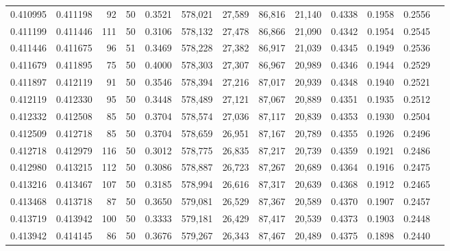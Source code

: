 \begin{tabular}{rrrrrrrrrrrrr}
0.410995 & 0.411198 &    92 &  50 &                                     0.3521 & 578,021 &  27,589 &  86,816 &  21,140 & 0.4338 & 0.1958 & 0.2556 \\
0.411199 & 0.411446 &   111 &  50 &                                     0.3106 & 578,132 &  27,478 &  86,866 &  21,090 & 0.4342 & 0.1954 & 0.2545 \\
0.411446 & 0.411675 &    96 &  51 &                                     0.3469 & 578,228 &  27,382 &  86,917 &  21,039 & 0.4345 & 0.1949 & 0.2536 \\
0.411679 & 0.411895 &    75 &  50 &                                     0.4000 & 578,303 &  27,307 &  86,967 &  20,989 & 0.4346 & 0.1944 & 0.2529 \\
0.411897 & 0.412119 &    91 &  50 &                                     0.3546 & 578,394 &  27,216 &  87,017 &  20,939 & 0.4348 & 0.1940 & 0.2521 \\
0.412119 & 0.412330 &    95 &  50 &                                     0.3448 & 578,489 &  27,121 &  87,067 &  20,889 & 0.4351 & 0.1935 & 0.2512 \\
0.412332 & 0.412508 &    85 &  50 &                                     0.3704 & 578,574 &  27,036 &  87,117 &  20,839 & 0.4353 & 0.1930 & 0.2504 \\
0.412509 & 0.412718 &    85 &  50 &                                     0.3704 & 578,659 &  26,951 &  87,167 &  20,789 & 0.4355 & 0.1926 & 0.2496 \\
0.412718 & 0.412979 &   116 &  50 &                                     0.3012 & 578,775 &  26,835 &  87,217 &  20,739 & 0.4359 & 0.1921 & 0.2486 \\
0.412980 & 0.413215 &   112 &  50 &                                     0.3086 & 578,887 &  26,723 &  87,267 &  20,689 & 0.4364 & 0.1916 & 0.2475 \\
0.413216 & 0.413467 &   107 &  50 &                                     0.3185 & 578,994 &  26,616 &  87,317 &  20,639 & 0.4368 & 0.1912 & 0.2465 \\
0.413468 & 0.413718 &    87 &  50 &                                     0.3650 & 579,081 &  26,529 &  87,367 &  20,589 & 0.4370 & 0.1907 & 0.2457 \\
0.413719 & 0.413942 &   100 &  50 &                                     0.3333 & 579,181 &  26,429 &  87,417 &  20,539 & 0.4373 & 0.1903 & 0.2448 \\
0.413942 & 0.414145 &    86 &  50 &                                     0.3676 & 579,267 &  26,343 &  87,467 &  20,489 & 0.4375 & 0.1898 & 0.2440 \\

\end{tabular}
